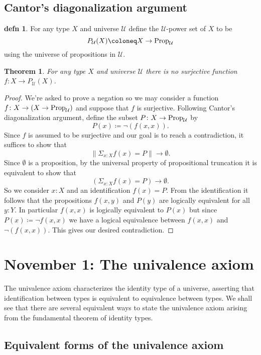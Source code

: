 \documentclass{amsart}
\theoremstyle{theorem}
\newtheorem*{thm}{Theorem}
\theoremstyle{definition}
\newtheorem*{defn}{defn}
\theoremstyle{remark}
\newcommand{\0}{\mathbbe{0}}
\newcommand{\1}{\mathbbe{1}}
\newcommand{\2}{\mathbbe{2}}
\newcommand{\3}{\mathbbe{3}}
\newcommand{\4}{\mathbbe{4}}
\newcommand{\type}[1]{{\textup{#1}}}
\newcommand{\UU}{{\mathcal{U}}}
\newcommand{\mere}[1]{\|{#1}\|}
\begin{document}
\subsection*{Cantor's diagonalization argument}

\begin{defn} For any type $X$ and universe $\UU$ define the $\UU$-power set of $X$ to be 
\[ P_{\UU}(X) \coloneq X \to \type{Prop}_{\UU}\]
using the universe of propositions in $\UU$.
\end{defn}

\begin{thm} For any type $X$ and universe $\UU$ there is no surjective function $f \colon X \to P_{\UU}(X)$.
\end{thm}
\begin{proof}
We're asked to prove a negation so we may consider a function $f \colon X \to (X \to \type{Prop}_{\UU})$ and suppose that $f$ is surjective. Following Cantor's diagonalization argument, define the subset $P \colon X \to \type{Prop}_{\UU}$ by
\[ P(x) \coloneq \neg(f(x,x)).\]
Since $f$ is assumed to be surjective and our goal is to reach a contradiction, it suffices to show that
\[ \mere{\Sigma_{x:X} f(x)=P} \to \emptyset.\]
Since $\emptyset$ is a proposition, by the universal property of propositional truncation it is equivalent to show that
\[ \left( {\Sigma_{x:X} f(x)=P}  \right) \to \emptyset.\]
So we consider $x:X$ and an identification $f(x)=P$. From the identification it follows that the propositions $f(x,y)$ and $P(y)$ are logically equivalent for all $y : Y$. In particular $f(x,x)$ is logically equivalent to $P(x)$ but since $P(x) \coloneq \neg f(x,x)$ we have a logical equivalence between $f(x,x)$ and $\neg(f(x,x))$. This gives our desired contradiction.
\end{proof}

\section*{November 1: The univalence axiom}

The univalence axiom characterizes the identity type of a universe, asserting that identification between types is equivalent to equivalence between types.  We shall see that there are several equivalent ways to state the univalence axiom arising from the fundamental theorem of identity types.

\subsection*{Equivalent forms of the univalence axiom}
\end{document}
